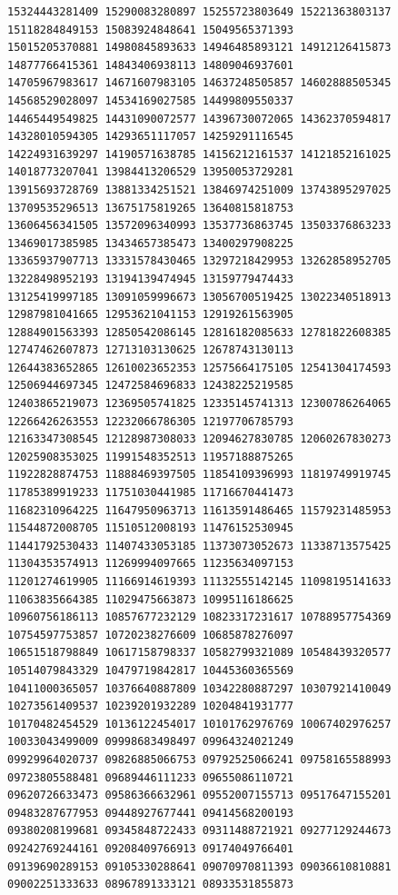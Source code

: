 \documentclass[9pt]{article}
\begin{document}
\begin{verbatim}
15324443281409 15290083280897 15255723803649 15221363803137 15118284849153 15083924848641 15049565371393
15015205370881 14980845893633 14946485893121 14912126415873 14877766415361 14843406938113 14809046937601
14705967983617 14671607983105 14637248505857 14602888505345 14568529028097 14534169027585 14499809550337
14465449549825 14431090072577 14396730072065 14362370594817 14328010594305 14293651117057 14259291116545
14224931639297 14190571638785 14156212161537 14121852161025 14018773207041 13984413206529 13950053729281
13915693728769 13881334251521 13846974251009 13743895297025 13709535296513 13675175819265 13640815818753
13606456341505 13572096340993 13537736863745 13503376863233 13469017385985 13434657385473 13400297908225
13365937907713 13331578430465 13297218429953 13262858952705 13228498952193 13194139474945 13159779474433
13125419997185 13091059996673 13056700519425 13022340518913 12987981041665 12953621041153 12919261563905
12884901563393 12850542086145 12816182085633 12781822608385 12747462607873 12713103130625 12678743130113
12644383652865 12610023652353 12575664175105 12541304174593 12506944697345 12472584696833 12438225219585
12403865219073 12369505741825 12335145741313 12300786264065 12266426263553 12232066786305 12197706785793
12163347308545 12128987308033 12094627830785 12060267830273 12025908353025 11991548352513 11957188875265
11922828874753 11888469397505 11854109396993 11819749919745 11785389919233 11751030441985 11716670441473
11682310964225 11647950963713 11613591486465 11579231485953 11544872008705 11510512008193 11476152530945
11441792530433 11407433053185 11373073052673 11338713575425 11304353574913 11269994097665 11235634097153
11201274619905 11166914619393 11132555142145 11098195141633 11063835664385 11029475663873 10995116186625
10960756186113 10857677232129 10823317231617 10788957754369 10754597753857 10720238276609 10685878276097
10651518798849 10617158798337 10582799321089 10548439320577 10514079843329 10479719842817 10445360365569
10411000365057 10376640887809 10342280887297 10307921410049 10273561409537 10239201932289 10204841931777
10170482454529 10136122454017 10101762976769 10067402976257 10033043499009 09998683498497 09964324021249
09929964020737 09826885066753 09792525066241 09758165588993 09723805588481 09689446111233 09655086110721
09620726633473 09586366632961 09552007155713 09517647155201 09483287677953 09448927677441 09414568200193
09380208199681 09345848722433 09311488721921 09277129244673 09242769244161 09208409766913 09174049766401
09139690289153 09105330288641 09070970811393 09036610810881 09002251333633 08967891333121 08933531855873

\end{verbatim}
\end{document}

